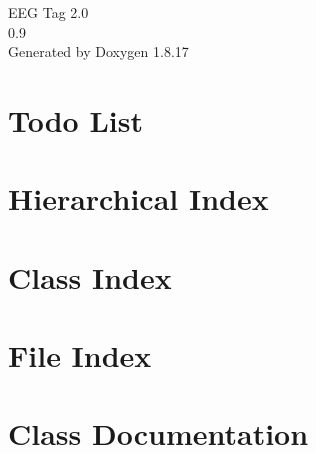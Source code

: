 \let\mypdfximage\pdfximage\def\pdfximage{\immediate\mypdfximage}\documentclass[twoside]{book}
\newcommand{\+}{\discretionary{\mbox{\scriptsize$\hookleftarrow$}}{}{}}
\newcommand{\clearemptydoublepage}{%
  \newpage{\pagestyle{empty}\cleardoublepage}%
}
\begin{document}
\hypersetup{pageanchor=false,
             bookmarksnumbered=true,
             pdfencoding=unicode
            }
\begin{titlepage}
\vspace*{7cm}
\begin{center}%
{\Large E\+EG Tag 2.0 \\[1ex]\large 0.\+9 }\\
\vspace*{1cm}
{\large Generated by Doxygen 1.8.17}\\
\end{center}
\end{titlepage}
\clearemptydoublepage
{}
\tableofcontents
\clearemptydoublepage
{}
\hypersetup{pageanchor=true}

\chapter{Todo List}
\label{todo}

\chapter{Hierarchical Index}

\chapter{Class Index}

\chapter{File Index}

\chapter{Class Documentation}




















































\end{document}
